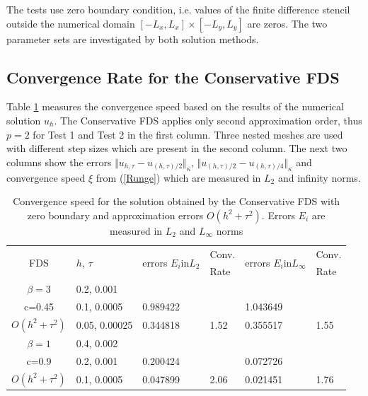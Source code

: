 \documentclass[%
 aip,
cp,  %
 amsmath,amssymb,%
 reprint,%
]{revtex4-2}
\newcommand{\rf}[1]{(\ref{#1})}
\begin{document}
The tests use zero boundary condition, i.e. values of the finite difference stencil outside the numerical domain $[-L_x, L_x] \times [-L_y, L_y]$ are zeros. The two parameter sets are investigated by both solution methods. 

\subsection{Convergence Rate for the Conservative FDS}

Table \ref{tableC} measures the convergence speed based on the results of the numerical solution $u_h$. The Conservative FDS applies only second approximation order, thus $p=2$ for Test 1 and Test 2 in the first column. Three nested meshes are used with different step sizes which are present in the second column. The next two columns show the errors $\Vert u_{h,\tau} - u_{(h,\tau)/2} \Vert_\kappa$, $\Vert  u_{(h,\tau)/2} - u_{(h,\tau)/4} \Vert_\kappa$ and convergence speed $\xi$ from \rf{Runge} which are measured in $L_2$ and infinity norms. 
\begin{table}[ht]
\centering
\small
		\begin{tabular}{||c|l|ll|ll||}
			\hline
			\hline
      \multirow{2  }{*}{FDS}        & \multirow{2  }{*}{$h$, $\tau$}  & \multirow{2  }{*}{errors $E_i$in$L_2$}  &Conv.& \multirow{2  }{*}{errors $E_i$in$L_\infty$}  &Conv.  \\
	                                        &                                                     &                                                                 &  Rate &                                                                       & Rate \\
   			\hline 
					\hline 
  $\beta=3$                &0.2, 0.001         &                    &                &                  &                   \\
   c=0.45                     &0.1, 0.0005         & 0.989422   &                & 1.043649  &                   \\
     $O(h^2 + \tau^ 2)$ &0.05, 0.00025  &0.344818    & 1.52       & 0.355517   &   1.55   \\
	   \hline
			\hline 
       $\beta=1$           & 0.4, 0.002       &                   &           &                 &   \\
                  c=0.9       & 0.2, 0.001        & 0.200424   &          &0.072726  &   \\
  $O(h^2+ \tau^2)$  & 0.1, 0.0005       & 0.047899   & 2.06  &0.021451  & 1.76 \\
	   \hline
			\hline 
		\end{tabular}
		\caption{Convergence speed for the solution obtained by the Conservative FDS with zero boundary and approximation errors $O(h^{2} + \tau^2 )$. Errors $E_i$ are measured in $L_2$ and $L_\infty$ norms}
\label{tableC}
\end{table}
\end{document}
